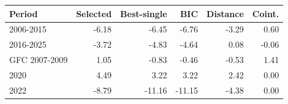 \begin{tabular}{@{}lrrrrr@{}}
\toprule
Period & Selected & Best-single & BIC & Distance & Coint. \\
\midrule
2006-2015 & -6.18 & -6.45 & -6.76 & -3.29 & 0.60 \\
2016-2025 & -3.72 & -4.83 & -4.64 & 0.08 & -0.06 \\
GFC 2007-2009 & 1.05 & -0.83 & -0.46 & -0.53 & 1.41 \\
2020 & 4.49 & 3.22 & 3.22 & 2.42 & 0.00 \\
2022 & -8.79 & -11.16 & -11.15 & -4.38 & 0.00 \\
\bottomrule
\end{tabular}
